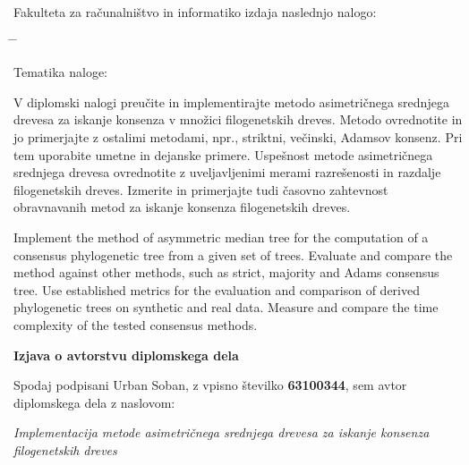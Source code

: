 \documentclass[a4paper, 12pt]{book}
\newcommand{\clearemptydoublepage}{\newpage{\pagestyle{empty}\cleardoublepage}}
\begin{document}
\thispagestyle{empty}
\vspace*{4cm}

\noindent
Fakulteta za računalništvo in informatiko izdaja naslednjo nalogo:
\medskip
\begin{tabbing}
\hspace{32mm}\= \hspace{6cm} \= \kill




Tematika naloge:
\end{tabbing}
V diplomski nalogi preučite in implementirajte metodo asimetričnega
srednjega drevesa za iskanje konsenza v množici filogenetskih dreves.
Metodo ovrednotite in jo primerjajte z ostalimi metodami, npr., striktni,
večinski, Adamsov konsenz. Pri tem uporabite umetne in dejanske primere.
Uspešnost metode asimetričnega srednjega drevesa ovrednotite z
uveljavljenimi merami razrešenosti in razdalje filogenetskih dreves.
Izmerite in primerjajte tudi časovno zahtevnost obravnavanih metod za
iskanje konsenza filogenetskih dreves.
\vspace{15mm}

\noindent Implement the method of asymmetric median tree for the computation of a
consensus phylogenetic tree from a given set of trees. Evaluate and compare
the method against other methods, such as strict, majority and Adams
consensus tree. Use established metrics for the evaluation and comparison
of derived phylogenetic trees on synthetic and real data. Measure and
compare the time complexity of the tested consensus methods.





\vspace{2cm}

\clearemptydoublepage

\vspace*{1cm}
\begin{center}
{\Large \textbf{\sc Izjava o avtorstvu diplomskega dela}}
\end{center}

\vspace{1cm}
\noindent Spodaj podpisani Urban Soban,
z vpisno številko \textbf{63100344}, sem avtor  diplomskega dela z naslovom:

\vspace{0.5cm}
\emph{Implementacija metode asimetričnega srednjega drevesa za iskanje konsenza filogenetskih dreves}
\end{document}
